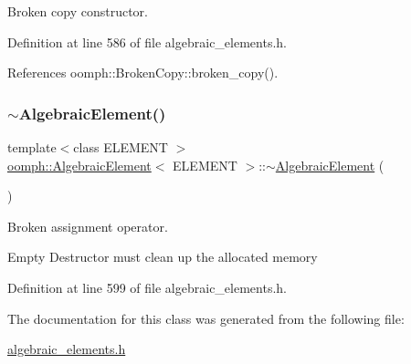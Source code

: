 Broken copy constructor. 



Definition at line 586 of file algebraic\+\_\+elements.\+h.



References oomph\+::\+Broken\+Copy\+::broken\+\_\+copy().

\mbox{\label{classoomph_1_1AlgebraicElement_a46a4575a8a218302acb4753b1675fdd7}} 
\subsubsection{\texorpdfstring{$\sim$\+Algebraic\+Element()}{~AlgebraicElement()}}
{\footnotesize\ttfamily template$<$class E\+L\+E\+M\+E\+NT $>$ \\
\hyperlink{classoomph_1_1AlgebraicElement}{oomph\+::\+Algebraic\+Element}$<$ E\+L\+E\+M\+E\+NT $>$\+::$\sim$\hyperlink{classoomph_1_1AlgebraicElement}{Algebraic\+Element} (\begin{DoxyParamCaption}{ }\end{DoxyParamCaption})\hspace{0.3cm}{\ttfamily [inline]}}



Broken assignment operator. 

Empty Destructor must clean up the allocated memory 

Definition at line 599 of file algebraic\+\_\+elements.\+h.



The documentation for this class was generated from the following file\+:\begin{DoxyCompactItemize}
\item 
\hyperlink{algebraic__elements_8h}{algebraic\+\_\+elements.\+h}\end{DoxyCompactItemize}
